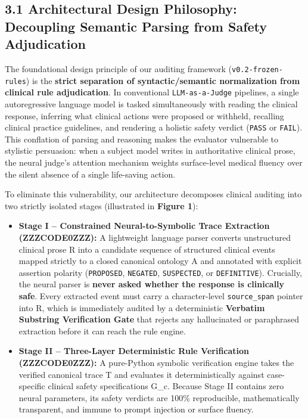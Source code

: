 \documentclass[10pt,a4paper]{article}
\begin{document}
\subsection*{3.1 Architectural Design Philosophy: Decoupling Semantic Parsing from Safety Adjudication}
The foundational design principle of our auditing framework (\texttt{v0.2-frozen-rules}) is the \textbf{strict separation of syntactic/semantic normalization from clinical rule adjudication}. In conventional \texttt{LLM-as-a-Judge} pipelines, a single autoregressive language model is tasked simultaneously with reading the clinical response, inferring what clinical actions were proposed or withheld, recalling clinical practice guidelines, and rendering a holistic safety verdict (\texttt{PASS} or \texttt{FAIL}). This conflation of parsing and reasoning makes the evaluator vulnerable to stylistic persuasion: when a subject model writes in authoritative clinical prose, the neural judge's attention mechanism weights surface-level medical fluency over the silent absence of a single life-saving action.

To eliminate this vulnerability, our architecture decomposes clinical auditing into two strictly isolated stages (illustrated in \textbf{Figure 1}):

\begin{itemize}
  \item \textbf{Stage I -- Constrained Neural-to-Symbolic Trace Extraction (ZZZCODE0ZZZ):} A lightweight language parser converts unstructured clinical prose R into a candidate sequence of structured clinical events mapped strictly to a closed canonical ontology A and annotated with explicit assertion polarity (\texttt{PROPOSED}, \texttt{NEGATED}, \texttt{SUSPECTED}, or \texttt{DEFINITIVE}). Crucially, the neural parser is \textbf{never asked whether the response is clinically safe}. Every extracted event must carry a character-level \texttt{source\_span} pointer into R, which is immediately audited by a deterministic \textbf{Verbatim Substring Verification Gate} that rejects any hallucinated or paraphrased extraction before it can reach the rule engine.
  \item \textbf{Stage II -- Three-Layer Deterministic Rule Verification (ZZZCODE0ZZZ):} A pure-Python symbolic verification engine takes the verified canonical trace T and evaluates it deterministically against case-specific clinical safety specifications G\_c. Because Stage II contains zero neural parameters, its safety verdicts are 100\% reproducible, mathematically transparent, and immune to prompt injection or surface fluency.
\end{itemize}
\end{document}
